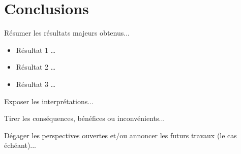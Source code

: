 \documentclass[11pt,a4paper,french]{article}
\begin{document}
\newpage
\section{Conclusions}

Résumer les résultats majeurs obtenus...

\begin{itemize}
	\item Résultat 1 \ldots
	\item Résultat 2 \ldots
	\item Résultat 3 \ldots
\end{itemize}

Exposer les interprétations...

Tirer les conséquences, bénéfices ou inconvénients...

Dégager les perspectives ouvertes et/ou annoncer les futurs travaux (le cas échéant)...
\end{document}
